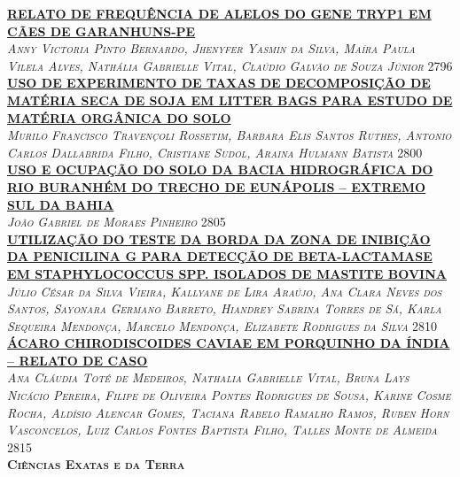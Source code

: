 \noindent \textsc{\hyperlink{trabalhos/251285.pdf.1}{\textbf{RELATO DE FREQUÊNCIA DE ALELOS DO GENE TRYP1 EM CÃES DE GARANHUNS-PE}}}\\ 
\noindent \textsc{\textit{Anny Victoria Pinto Bernardo, Jhenyfer Yasmin da Silva, Maíra Paula Vilela Alves, Nathália Gabrielle Vital, Claúdio Galvão de Souza Júnior}} \hfill 2796\\ 

\noindent \textsc{\hyperlink{trabalhos/250401.pdf.1}{\textbf{USO DE EXPERIMENTO DE TAXAS DE DECOMPOSIÇÃO DE MATÉRIA SECA DE SOJA EM LITTER BAGS PARA ESTUDO DE MATÉRIA ORGÂNICA DO SOLO}}}\\ 
\noindent \textsc{\textit{Murilo Francisco Travençoli Rossetim, Barbara Elis Santos Ruthes, Antonio Carlos Dallabrida Filho, Cristiane Sudol, Araina Hulmann Batista}} \hfill 2800\\ 

\noindent \textsc{\hyperlink{trabalhos/249092.pdf.1}{\textbf{USO E OCUPAÇÃO DO SOLO DA BACIA HIDROGRÁFICA DO RIO BURANHÉM DO TRECHO DE EUNÁPOLIS – EXTREMO SUL DA BAHIA}}}\\ 
\noindent \textsc{\textit{João Gabriel de Moraes Pinheiro}} \hfill 2805\\ 

\noindent \textsc{\hyperlink{trabalhos/251373.pdf.1}{\textbf{UTILIZAÇÃO DO TESTE DA BORDA DA ZONA DE INIBIÇÃO DA PENICILINA G PARA DETECÇÃO DE BETA-LACTAMASE EM STAPHYLOCOCCUS SPP. ISOLADOS DE MASTITE BOVINA }}}\\ 
\noindent \textsc{\textit{Júlio César da Silva Vieira, Kallyane de Lira Araújo, Ana Clara Neves dos Santos, Sayonara Germano Barreto, Hiandrey Sabrina Torres de Sá, Karla Sequeira Mendonça, Marcelo Mendonça, Elizabete Rodrigues da Silva}} \hfill 2810\\ 

\noindent \textsc{\hyperlink{trabalhos/251689.pdf.1}{\textbf{ÁCARO CHIRODISCOIDES CAVIAE EM PORQUINHO DA ÍNDIA – RELATO DE CASO }}}\\ 
\noindent \textsc{\textit{Ana Cláudia Toté de Medeiros, Nathalia Gabrielle Vital, Bruna Lays Nicácio Pereira, Filipe de Oliveira Pontes Rodrigues de Sousa, Karine Cosme Rocha, Aldísio Alencar Gomes, Taciana Rabelo Ramalho Ramos, Ruben Horn Vasconcelos, Luiz Carlos Fontes Baptista Filho, Talles Monte de Almeida}} \hfill 2815\\ 


\vspace*{2cm} 
\noindent \textsc{\textbf{\LARGE Ciências Exatas e da Terra}}\\ 
\vspace*{1cm} 


